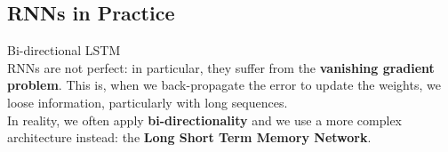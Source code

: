 \documentclass[UKenglish]{beamer}
\begin{document}
\subsection{RNNs in Practice}
\begin{frame}{Bi-directional LSTM}
\vspace{0.3cm}\\
    RNNs are not perfect: in particular, they suffer from the \textbf{vanishing gradient problem}. This is, when we back-propagate the error to update the weights, we loose information, particularly with long sequences.\\
    In reality, we often apply \textbf{bi-directionality} { and we use a more complex architecture instead: the \textbf{Long Short Term Memory Network}}.
\end{frame}
\end{document}
